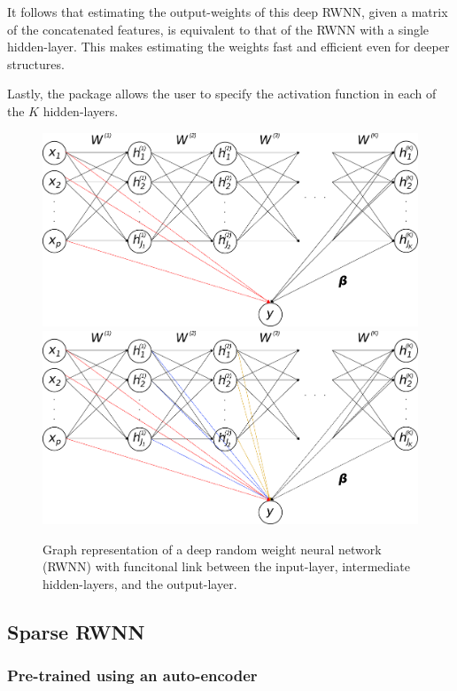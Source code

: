 \documentclass[
]{jss}
\begin{document}
It follows that estimating the output-weights of this deep RWNN, given a
matrix of the concatenated features, is equivalent to that of the RWNN
with a single hidden-layer. This makes estimating the weights fast and
efficient even for deeper structures.

Lastly, the  package allows the user to specify the activation
function in each of the \(K\) hidden-layers.

\begin{CodeChunk}
\begin{figure}[ht!]

{\centering \includegraphics[width=0.45\linewidth]{./Figures/deepRWNN} \includegraphics[width=0.45\linewidth]{./Figures/deepRWNNalt} 

}

\caption[Graph representation of a deep random weight neural network (RWNN) with funcitonal link between the input-layer, intermediate hidden-layers, and the output-layer]{Graph representation of a deep random weight neural network (RWNN) with funcitonal link between the input-layer, intermediate hidden-layers, and the output-layer.}\label{fig:deeprwnn}
\end{figure}
\end{CodeChunk}

\hypertarget{sparse-rwnn}{%
\subsection{Sparse RWNN}\label{sparse-rwnn}}

\hypertarget{pre-trained-using-an-auto-encoder}{%
\subsubsection{Pre-trained using an
auto-encoder}\label{pre-trained-using-an-auto-encoder}}
\end{document}
